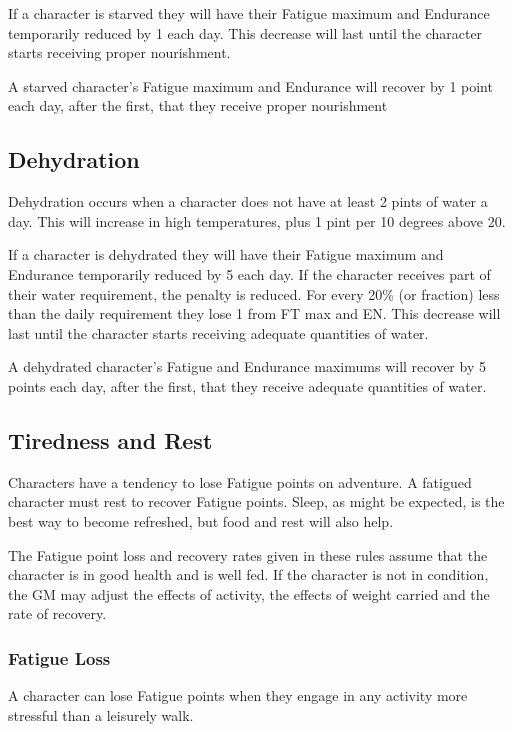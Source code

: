\begin{multicols*}{3}
If a character is starved they will have their Fatigue maximum and
Endurance temporarily reduced by 1 each day. This decrease will last
until the character starts receiving proper nourishment.

A starved character's Fatigue maximum and Endurance will recover by 1
point each day, after the first, that they receive proper nourishment

\subsection{Dehydration}

Dehydration occurs when a character does not have at least 2 pints of
water a day. This will increase in high temperatures, plus 1 pint per
10 degrees above 20.

If a character is dehydrated they will have their Fatigue maximum and
Endurance temporarily reduced by 5 each day. If the character receives
part of their water requirement, the penalty is reduced. For every
20\% (or fraction) less than the daily requirement they lose 1 from FT
max and EN. This decrease will last until the character starts
receiving adequate quantities of water.

A dehydrated character's Fatigue and Endurance maximums will recover
by 5 points each day, after the first, that they receive adequate
quantities of water.

\subsection{Tiredness and Rest}

Characters have a tendency to lose Fatigue points on adventure. A
fatigued character must rest to recover Fatigue points. Sleep, as
might be expected, is the best way to become refreshed, but food and
rest will also help.

The Fatigue point loss and recovery rates given in these rules assume
that the character is in good health and is well fed. If the character
is not in condition, the GM may adjust the effects of activity, the
effects of weight carried and the rate of recovery.

\subsubsection{Fatigue Loss}
\label{adventure:exercise}
A character can lose Fatigue points when they engage in any activity
more stressful than a leisurely walk.


\end{multicols*}
